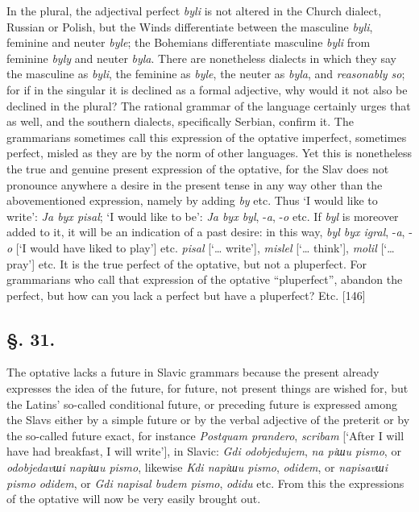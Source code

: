In the plural, the adjectival perfect \textit{byli} is not altered in the Church dialect, Russian or Polish, but the Winds differentiate between the masculine \textit{byli}, feminine and neuter \textit{byle}; the Bohemians differentiate masculine \textit{byli} from feminine \textit{byly} and neuter \textit{byla}. There are nonetheless dialects in which they say the masculine as \textit{byli}, the feminine as \textit{byle}, the neuter as \textit{byla}, and \textit{reasonably so}; for if in the singular it is declined as a formal adjective, why would it not also be declined in the plural? The rational grammar of the language certainly urges that as well, and the southern dialects, specifically Serbian, confirm it. The grammarians sometimes call this expression of the optative imperfect, sometimes perfect, misled as they are by the norm of other languages. Yet this is nonetheless the true and genuine present expression of the optative, for the Slav does not pronounce anywhere a desire in the present tense in any way other than the abovementioned expression, namely by adding \textit{by} etc. Thus ‘I would like to write’: \textit{Ja byx pisal}; ‘I would like to be’: \textit{Ja byx byl}, -\textit{a}, -\textit{o} etc. If \textit{byl} is moreover added to it, it will be an indication of a past desire: in this way, \textit{byl byx igral}, -\textit{a}, -\textit{o} [‘I would have liked to play’] etc. \textit{pisal} [‘… write’], \textit{mislel} [‘… think’], \textit{molil} [‘… pray’] etc. It is the true perfect of the optative, but not a pluperfect. For grammarians who call that expression of the optative “pluperfect”, abandon the perfect, but how can you lack a perfect but have a pluperfect? Etc. [146]

\subsection*{\hspace*{\fill}§. 31.\hspace*{\fill}}

The optative lacks a future in Slavic grammars because the present already expresses the idea of the future, for future, not present things are wished for, but the Latins’ so-called conditional future, or preceding future is expressed among the Slavs either by a simple future or by the verbal adjective of the preterit or by the so-called future exact, for instance \textit{Postquam prandero}, \textit{scribam} [‘After I will have had breakfast, I will write’], in Slavic: \textit{Gdi odobjedujem}, \textit{na piшu pismo}, or \textit{odobjedavшi napiшu pismo}, likewise \textit{Kdi napiшu pismo}, \textit{odidem}, or \textit{napisavшi pismo odidem}, or \textit{Gdi napisal budem pismo}, \textit{odidu} etc. From this the expressions of the optative will now be very easily brought out.

